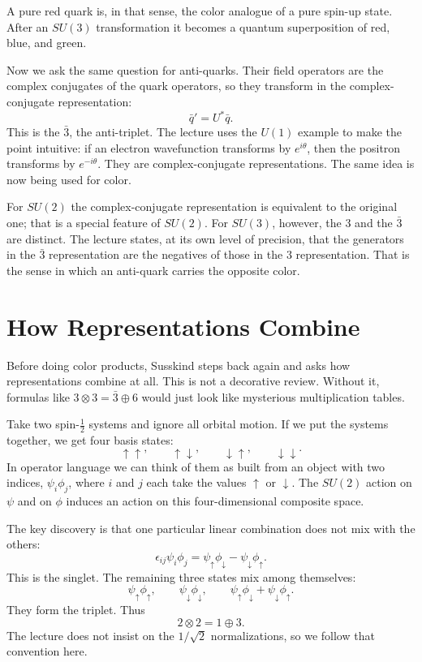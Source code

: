 A pure red quark is, in that sense, the color analogue of a pure spin-up state. After an \(SU(3)\) transformation it becomes a quantum superposition of red, blue, and green.

Now we ask the same question for anti-quarks. Their field operators are the complex conjugates of the quark operators, so they transform in the complex-conjugate representation:
\begin{equation}
\bar q' = U^* \bar q.
\end{equation}
This is the \(\bar 3\), the anti-triplet. The lecture uses the \(U(1)\) example to make the point intuitive: if an electron wavefunction transforms by \(e^{i\theta}\), then the positron transforms by \(e^{-i\theta}\). They are complex-conjugate representations. The same idea is now being used for color.

For \(SU(2)\) the complex-conjugate representation is equivalent to the original one; that is a special feature of \(SU(2)\). For \(SU(3)\), however, the \(3\) and the \(\bar 3\) are distinct. The lecture states, at its own level of precision, that the generators in the \(\bar 3\) representation are the negatives of those in the \(3\) representation. That is the sense in which an anti-quark carries the opposite color.

\section{How Representations Combine}

Before doing color products, Susskind steps back again and asks how representations combine at all. This is not a decorative review. Without it, formulas like \(3\otimes3=\bar 3\oplus6\) would just look like mysterious multiplication tables.

Take two spin-\(\frac12\) systems and ignore all orbital motion. If we put the systems together, we get four basis states:
\[
\uparrow\uparrow,\qquad
\uparrow\downarrow,\qquad
\downarrow\uparrow,\qquad
\downarrow\downarrow.
\]
In operator language we can think of them as built from an object with two indices, \(\psi_i\phi_j\), where \(i\) and \(j\) each take the values \(\uparrow\) or \(\downarrow\). The \(SU(2)\) action on \(\psi\) and on \(\phi\) induces an action on this four-dimensional composite space.

The key discovery is that one particular linear combination does not mix with the others:
\begin{equation}
\epsilon_{ij}\psi_i\phi_j
=
\psi_\uparrow\phi_\downarrow-\psi_\downarrow\phi_\uparrow.
\end{equation}
This is the singlet. The remaining three states mix among themselves:
\begin{equation}
\psi_\uparrow\phi_\uparrow,\qquad
\psi_\downarrow\phi_\downarrow,\qquad
\psi_\uparrow\phi_\downarrow+\psi_\downarrow\phi_\uparrow.
\end{equation}
They form the triplet. Thus
\begin{equation}
2\otimes2 = 1\oplus3.
\end{equation}
The lecture does not insist on the \(1/\sqrt2\) normalizations, so we follow that convention here.

